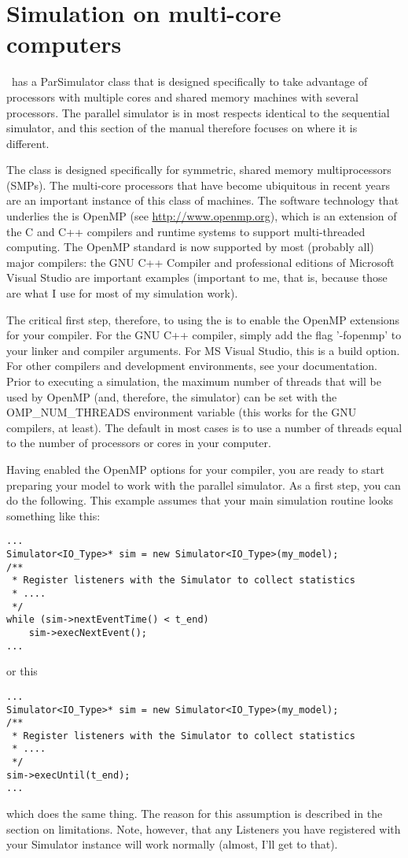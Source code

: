 \chapter{Simulation on multi-core computers}
\adevs\ has a ParSimulator class that is designed specifically to take advantage of processors with multiple cores and shared memory machines with several processors. The parallel simulator is in most respects identical to the sequential simulator, and this section of the manual therefore focuses on where it is different.

The  class is designed specifically for symmetric, shared memory multiprocessors (SMPs). The multi-core processors that have become ubiquitous in recent years are an important instance of this class of machines. The software technology that underlies the  is OpenMP (see \url{http://www.openmp.org}), which is an extension of the C and C++ compilers and runtime systems to support multi-threaded computing. The OpenMP standard is now supported by most (probably all) major compilers: the GNU C++ Compiler and professional editions of Microsoft Visual Studio are important examples (important to me, that is, because those are what I use for most of my simulation work).

The critical first step, therefore, to using the  is to enable the OpenMP extensions for your compiler. For the GNU C++ compiler, simply add the flag '-fopenmp' to your linker and compiler arguments. For MS Visual Studio, this is a build option. For other compilers and development environments, see your documentation. Prior to executing a simulation, the maximum number of threads that will be used by OpenMP (and, therefore, the simulator) can be set with the OMP\_NUM\_THREADS environment variable (this works for the GNU compilers, at least). The default in most cases is to use a number of threads equal to the number of processors or cores in your computer.

Having enabled the OpenMP options for your compiler, you are ready to start preparing your model to work with the parallel simulator. As a first step, you can do the following. This example assumes that your main simulation routine looks something like this:
\begin{verbatim}
...
Simulator<IO_Type>* sim = new Simulator<IO_Type>(my_model);
/**
 * Register listeners with the Simulator to collect statistics
 * ....
 */
while (sim->nextEventTime() < t_end)
    sim->execNextEvent();
...
\end{verbatim}
or this
\begin{verbatim}
...
Simulator<IO_Type>* sim = new Simulator<IO_Type>(my_model);
/**
 * Register listeners with the Simulator to collect statistics
 * ....
 */
sim->execUntil(t_end);
...
\end{verbatim}
which does the same thing. The reason for this assumption is described in the section on limitations. Note, however, that any Listeners you have registered with your Simulator instance will work normally (almost, I'll get to that).

